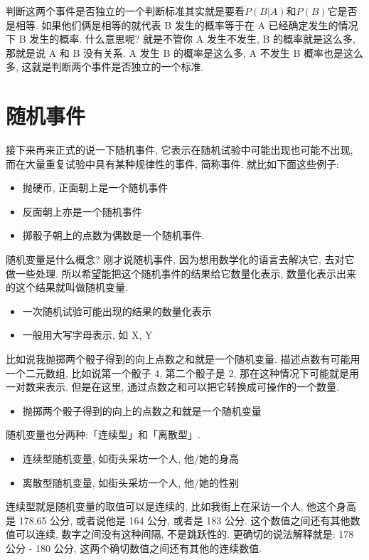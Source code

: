 判断这两个事件是否独立的一个判断标准其实就是要看$P(B|A)$和$P(B)$它是否是相等. 如果他们俩是相等的就代表 B 发生的概率等于在 A 已经确定发生的情况下 B 发生的概率. 什么意思呢? 就是不管你 A 发生不发生, B 的概率就是这么多, 那就是说 A 和 B 没有关系. A 发生 B 的概率是这么多, A 不发生 B 概率也是这么多, 这就是判断两个事件是否独立的一个标准. 

\section{随机事件}

接下来再来正式的说一下随机事件, 它表示在随机试验中可能出现也可能不出现, 而在大量重复试验中具有某种规律性的事件, 简称事件. 就比如下面这些例子:

\begin{itemize}
  \item 抛硬币, 正面朝上是一个随机事件
  \item 反面朝上亦是一个随机事件
  \item 掷骰子朝上的点数为偶数是一个随机事件. 
\end{itemize}

随机变量是什么概念? 刚才说随机事件, 因为想用数学化的语言去解决它, 去对它做一些处理. 所以希望能把这个随机事件的结果给它数量化表示, 数量化表示出来的这个结果就叫做随机变量. 

\begin{itemize}
  \item 一次随机试验可能出现的结果的数量化表示
  \item 一般用大写字母表示,  如 X, Y
\end{itemize}

比如说我抛掷两个骰子得到的向上点数之和就是一个随机变量. 描述点数有可能用一个二元数组, 比如说第一个骰子 4, 第二个骰子是 2, 那在这种情况下可能就是用一对数来表示. 但是在这里, 通过点数之和可以把它转换成可操作的一个数量. 

\begin{itemize}
  \item 抛掷两个骰子得到的向上的点数之和就是一个随机变量
\end{itemize}

随机变量也分两种:「连续型」和「离散型」. 
\begin{itemize}
  \item 连续型随机变量, 如街头采坊一个人, 他/她的身高
  \item 离散型随机变量, 如街头采坊一个人, 他/她的性别
\end{itemize}

连续型就是随机变量的取值可以是连续的, 比如我街上在采访一个人, 他这个身高是 178.65 公分, 或者说他是 164 公分, 或者是 183 公分. 这个数值之间还有其他数值可以连续, 数字之间没有这种间隔, 不是跳跃性的. 更确切的说法解释就是: 178 公分 - 180 公分, 这两个确切数值之间还有其他的连续数值. 

